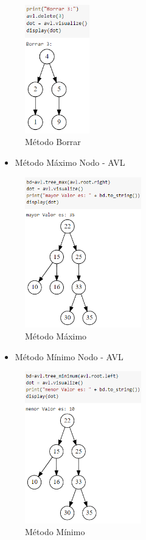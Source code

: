 \documentclass{article}
\begin{document}
\begin{enumerate}
\begin{figure}[H]
\centering
\includegraphics[width=0.25\textwidth]{Img/met_borrar.png}
\caption{Método Borrar}
\end{figure}

\begin{itemize}
   \item Método Máximo Nodo - AVL
\end{itemize}

\begin{figure}[H]
\centering
\includegraphics[width=0.45\textwidth]{Img/max_AVL.png}
\caption{Método Máximo}
\end{figure}

\begin{itemize}
   \item Método Mínimo Nodo - AVL
\end{itemize}

\begin{figure}[H]
\centering
\includegraphics[width=0.45\textwidth]{Img/min_AVL.png}
\caption{Método Mínimo}
\end{figure}


\end{enumerate}
\end{document}
